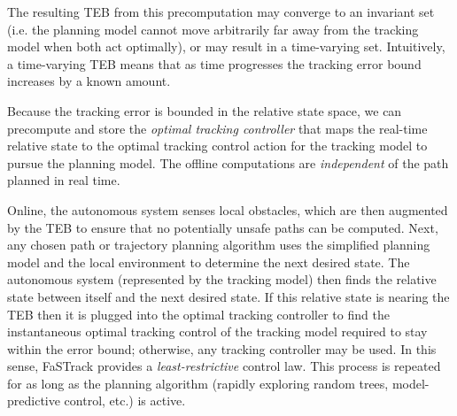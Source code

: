 The resulting TEB from this precomputation may converge to an invariant set (i.e. the planning model cannot move arbitrarily far away from the tracking model when both act optimally), or may result in a time-varying set.
Intuitively, a time-varying TEB means that as time progresses the tracking error bound increases by a known amount.

Because the tracking error is bounded in the relative state space, we can precompute and store the \textit{optimal tracking controller} that maps the real-time relative state to the optimal tracking control action for the tracking model to pursue the planning model. 
The offline computations are \textit{independent} of the path planned in real time.

Online, the autonomous system senses local obstacles, which are then augmented by the TEB to ensure that no potentially unsafe paths can be computed. 
Next, any chosen path or trajectory planning algorithm uses the simplified planning model and the local environment to determine the next desired state. 
The autonomous system (represented by the tracking model) then finds the relative state between itself and the next desired state. 
If this relative state is nearing the TEB then it is plugged into the optimal tracking controller to find the instantaneous optimal tracking control of the tracking model required to stay within the error bound; otherwise, any tracking controller may be used. In this sense, FaSTrack provides a \emph{least-restrictive} control law.
This process is repeated for as long as the planning algorithm (rapidly exploring random trees, model-predictive control, etc.) is active. 

